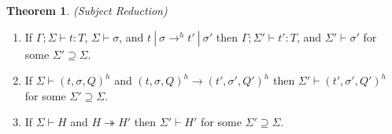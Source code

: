 \documentclass{article}
\theoremstyle{definition}
\newtheorem{thm}{Theorem}[section]
\begin{document}
\begin{thm}
\emph{(Subject Reduction)}\label{th:pres}

\begin{enumerate}

\item If $\Gamma ; \Sigma \vdash t : T$, $\Sigma \vdash \sigma$, and $t~|~\sigma \rightarrow^h t'~|~\sigma'$ then $\Gamma ; \Sigma' \vdash t' : T$, and $\Sigma' \vdash \sigma'$ for some $\Sigma' \supseteq \Sigma$.

\item If $\Sigma \vdash (t, \sigma, Q)^h$ and $(t, \sigma, Q)^h \longrightarrow (t', \sigma', Q')^h$ then $\Sigma' \vdash (t', \sigma', Q')^h$ for some $\Sigma' \supseteq \Sigma$.

\item If $\Sigma \vdash H$ and $H \twoheadrightarrow H'$ then $\Sigma' \vdash H'$ for some $\Sigma' \supseteq \Sigma$.

\end{enumerate}

\end{thm}
\end{document}
